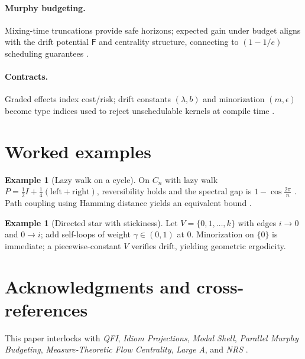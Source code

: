 \documentclass[11pt]{article}
\theoremstyle{plain}
\theoremstyle{definition}
\newtheorem{example}[theorem]{Example}
\theoremstyle{remark}
\newcommand{\1}{\mathds{1}}
\newcommand{\Free}{\mathsf{F}}
\begin{document}
\paragraph{Murphy budgeting.} Mixing-time truncations provide safe horizons; expected gain under budget aligns with the drift potential $\Free$ and centrality structure, connecting to $(1-1/e)$ scheduling guarantees \cite{MurphyBudget2025,LevinPeresWilmer2009}.

\paragraph{Contracts.} Graded effects index cost/risk; drift constants $(\lambda,b)$ and minorization $(m,\epsilon)$ become type indices used to reject unschedulable kernels at compile time \cite{GradedEffects2025}.

\section{Worked examples}
\begin{example}[Lazy walk on a cycle]
On $C_n$ with lazy walk $P=\tfrac12 I+\tfrac14(\text{left}+\text{right})$, reversibility holds and the spectral gap is $1-\cos\frac{2\pi}{n}$ \cite{LevinPeresWilmer2009}. Path coupling using Hamming distance yields an equivalent bound \cite{BubleyDyer1997}.
\end{example}

\begin{example}[Directed star with stickiness]
Let $V=\{0,1,\dots,k\}$ with edges $i\to 0$ and $0\to i$; add self-loops of weight $\gamma\in(0,1)$ at $0$. Minorization on $\{0\}$ is immediate; a piecewise-constant $V$ verifies drift, yielding geometric ergodicity.
\end{example}

\section*{Acknowledgments and cross-references}
This paper interlocks with \emph{QFI}, \emph{Idiom Projections}, \emph{Modal Shell}, \emph{Parallel Murphy Budgeting}, \emph{Measure‑Theoretic Flow Centrality}, \emph{Large A}, and \emph{NRS} \cite{QFI2025,IdiomProjections2025,ModalShell2025,MurphyBudget2025,FlowCentrality2025,GradedEffects2025,NRSinPrep2025}.

\nocite{*}
\printbibliography
\end{document}
